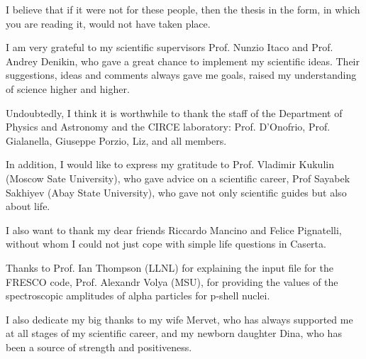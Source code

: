 \documentclass[
12pt, %
oneside, %
english, %
onehalfspacing, %
onehalfspacing, %
headsepline, %
]{MastersDoctoralThesis} %
\begin{document}

\begin{acknowledgements}
\addchaptertocentry{\acknowledgementname} %
I believe that if it were not for these people, then the thesis in the form, in which you are reading it, would not have taken place.

I am very grateful to my scientific supervisors Prof. Nunzio Itaco and Prof. Andrey Denikin, who gave a great chance to implement my scientific ideas. Their suggestions, ideas and comments always gave me goals, raised my understanding of science higher and higher.

Undoubtedly, I think it is worthwhile to thank the staff of the Department of Physics and Astronomy and the CIRCE laboratory: Prof. D'Onofrio, Prof. Gialanella, Giuseppe Porzio, Liz, and all members.

In addition, I would like to express my gratitude to Prof. Vladimir Kukulin (Moscow Sate University), who gave advice on a scientific career, Prof Sayabek Sakhiyev (Abay State University), who gave not only scientific guides but also about life.

I also want to thank my dear friends Riccardo Mancino and Felice Pignatelli, without whom I could not just cope with simple life questions in Caserta.

Thanks to Prof. Ian Thompson (LLNL) for explaining the input file for the FRESCO code, Prof. Alexandr Volya (MSU), for providing the values of the spectroscopic amplitudes of alpha particles for p-shell nuclei.

I also dedicate my big thanks to my wife Mervet, who has always supported me at all stages of my scientific career, and my newborn daughter Dina, who has been a source of strength and positiveness.
\end{acknowledgements}


\tableofcontents %

\listoffigures %

\listoftables %
\end{document}
